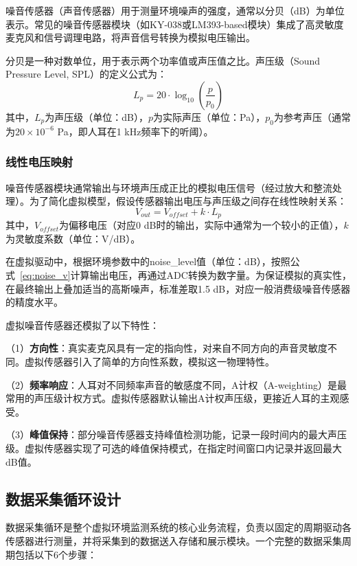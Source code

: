 \documentclass[12pt,a4paper]{ctexart}
\begin{document}
噪音传感器（声音传感器）用于测量环境噪声的强度，通常以分贝（dB）为单位表示。常见的噪音传感器模块（如KY-038或LM393-based模块）集成了高灵敏度麦克风和信号调理电路，将声音信号转换为模拟电压输出。

分贝是一种对数单位，用于表示两个功率值或声压值之比。声压级（Sound Pressure Level, SPL）的定义公式为：
\begin{equation}
    L_p = 20 \cdot \log_{10}\left(\frac{p}{p_0}\right)
    \label{eq:spl}
\end{equation}
其中，$L_p$为声压级（单位：dB），$p$为实际声压（单位：Pa），$p_0$为参考声压（通常为$20 \times 10^{-6}$ Pa，即人耳在1 kHz频率下的听阈）。

\subsubsection{线性电压映射}

噪音传感器模块通常输出与环境声压成正比的模拟电压信号（经过放大和整流处理）。为了简化虚拟模型，假设传感器输出电压与声压级之间存在线性映射关系：
\begin{equation}
    V_{out} = V_{offset} + k \cdot L_p
    \label{eq:noise_v}
\end{equation}
其中，$V_{offset}$为偏移电压（对应0 dB时的输出，实际中通常为一个较小的正值），$k$为灵敏度系数（单位：V/dB）。

在虚拟驱动中，根据环境参数中的noise\_level值（单位：dB），按照公式~\ref{eq:noise_v}计算输出电压，再通过ADC转换为数字量。为保证模拟的真实性，在最终输出上叠加适当的高斯噪声，标准差取1.5 dB，对应一般消费级噪音传感器的精度水平。

虚拟噪音传感器还模拟了以下特性：

（1）\textbf{方向性}：真实麦克风具有一定的指向性，对来自不同方向的声音灵敏度不同。虚拟传感器引入了简单的方向性系数，模拟这一物理特性。

（2）\textbf{频率响应}：人耳对不同频率声音的敏感度不同，A计权（A-weighting）是最常用的声压级计权方式。虚拟传感器默认输出A计权声压级，更接近人耳的主观感受。

（3）\textbf{峰值保持}：部分噪音传感器支持峰值检测功能，记录一段时间内的最大声压级。虚拟传感器实现了可选的峰值保持模式，在指定时间窗口内记录并返回最大dB值。

\subsection{数据采集循环设计}

数据采集循环是整个虚拟环境监测系统的核心业务流程，负责以固定的周期驱动各传感器进行测量，并将采集到的数据送入存储和展示模块。一个完整的数据采集周期包括以下6个步骤：
\end{document}
